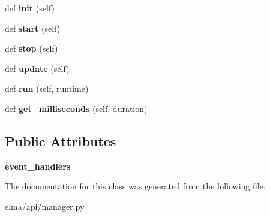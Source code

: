 \begin{DoxyCompactItemize}
def {\bfseries init} (self)
\item 
\mbox{\label{classelma_1_1api_1_1manager_1_1Manager_a7e9916576b109e0d633c55e3854d1b78}} 
def {\bfseries start} (self)
\item 
\mbox{\label{classelma_1_1api_1_1manager_1_1Manager_a0feb4a517ab5840dcb6d8e15d33f22be}} 
def {\bfseries stop} (self)
\item 
\mbox{\label{classelma_1_1api_1_1manager_1_1Manager_acb942259598dffdb074bea5171f0e2e9}} 
def {\bfseries update} (self)
\item 
\mbox{\label{classelma_1_1api_1_1manager_1_1Manager_a241f798dcfb0cda2a47d744d8713c456}} 
def {\bfseries run} (self, runtime)
\item 
\mbox{\label{classelma_1_1api_1_1manager_1_1Manager_ab077b5cf1492213bc057f6a19fc78950}} 
def {\bfseries get\+\_\+milliseconds} (self, duration)
\end{DoxyCompactItemize}
\subsection*{Public Attributes}
\begin{DoxyCompactItemize}
\item 
\mbox{\label{classelma_1_1api_1_1manager_1_1Manager_a7ec673d8f79675c813f7a5aca8adab8d}} 
{\bfseries event\+\_\+handlers}
\end{DoxyCompactItemize}


The documentation for this class was generated from the following file\+:\begin{DoxyCompactItemize}
\item 
elma/api/manager.\+py\end{DoxyCompactItemize}
